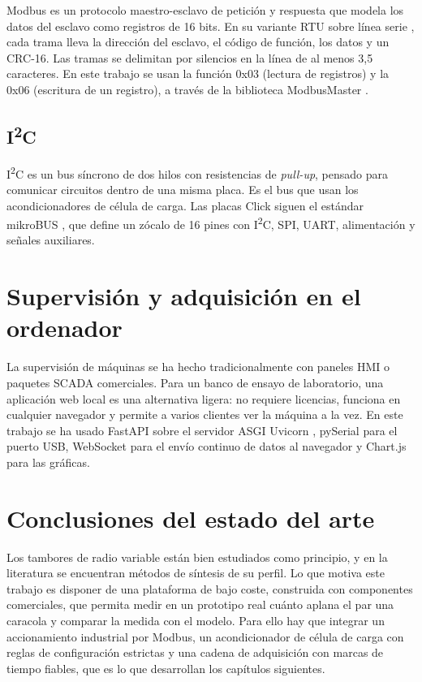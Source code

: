 Modbus \cite{modbusapp} es un protocolo maestro-esclavo de petición y respuesta que modela los
datos del esclavo como registros de 16 bits. En su variante RTU sobre línea serie
\cite{modbusserial}, cada trama lleva la dirección del esclavo, el código de función, los datos y
un CRC-16. Las tramas se delimitan por silencios en la línea de al menos 3,5 caracteres. En este
trabajo se usan la función 0x03 (lectura de registros) y la 0x06 (escritura de un registro), a
través de la biblioteca ModbusMaster \cite{modbusmaster}.

\subsection{I\textsuperscript{2}C}

I\textsuperscript{2}C \cite{i2cspec} es un bus síncrono de dos hilos con resistencias de
\emph{pull-up}, pensado para comunicar circuitos dentro de una misma placa. Es el bus que usan los
acondicionadores de célula de carga. Las placas Click siguen el estándar mikroBUS \cite{mikrobus},
que define un zócalo de 16 pines con I\textsuperscript{2}C, SPI, UART, alimentación y señales
auxiliares.

\section{Supervisión y adquisición en el ordenador}

La supervisión de máquinas se ha hecho tradicionalmente con paneles HMI o paquetes SCADA
comerciales. Para un banco de ensayo de laboratorio, una aplicación web local es una alternativa
ligera: no requiere licencias, funciona en cualquier navegador y permite a varios clientes ver la
máquina a la vez. En este trabajo se ha usado FastAPI \cite{fastapi} sobre el servidor ASGI Uvicorn
\cite{uvicorn}, pySerial \cite{pyserial} para el puerto USB, WebSocket \cite{rfc6455} para el envío
continuo de datos al navegador y Chart.js \cite{chartjs} para las gráficas.

\section{Conclusiones del estado del arte}

Los tambores de radio variable están bien estudiados como principio, y en la literatura se
encuentran métodos de síntesis de su perfil. Lo que motiva este trabajo es disponer de una
plataforma de bajo coste, construida con componentes comerciales, que permita medir en un
prototipo real cuánto aplana el par una caracola y comparar la medida con el modelo. Para ello
hay que integrar un accionamiento industrial por Modbus, un acondicionador de célula de carga con
reglas de configuración estrictas y una cadena de adquisición con marcas de tiempo fiables, que
es lo que desarrollan los capítulos siguientes.
